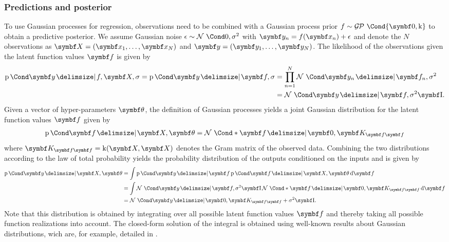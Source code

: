 \subsubsection{Predictions and posterior}
To use Gaussian processes for regression, observations need to be combined with a Gaussian process prior $f \sim \GP\Cond{\mat{0}, \K}$ to obtain a predictive posterior.
We assume Gaussian noise $\epsilon \sim \Gaussian{0, \sigma^2}$ with $\mat{y}_n = f(\mat{x}_n) + \epsilon$ and denote the $N$ observations as $\mat{X} = (\mat{x}_1, \dots, \mat{x}_N)$ and $\mat{y} = (\mat{y}_1, \dots, \mat{y}_N)$.
The likelihood of the observations given the latent function values $\mat{f}$ is given by
\begin{equation}
    \begin{split}
        \Prob{\mat{y} \given f, \mat{X}, \sigma}
        = \Prob{\mat{y} \given \mat{f}, \sigma}
        &= \prod_{n = 1}^N \Gaussian{\mat{y}_n \given \mat{f}_n, \sigma^2} \\
        &= \Gaussian{\mat{y} \given \mat{f}, \sigma^2 \Eye}.
    \end{split}
\end{equation}
Given a vector of hyper-parameters $\mat{\theta}$, the definition of Gaussian processes yields a joint Gaussian distribution for the latent function values $\mat{f}$ given by
\begin{align}
    \Prob{\mat{f} \given \mat{X}, \mat{\theta}} = \Gaussian*{\mat{f} \given \mat{0}, \mat{K}_{\mat{f}\mat{f}}}
\end{align}
where $\mat{K}_{\mat{f}\mat{f}} = \K(\mat{X}, \mat{X})$ denotes the Gram matrix of the observed data.
Combining the two distributions according to the law of total probability yields the probability distribution of the outputs conditioned on the inputs and is given by
\begin{equation}
    \begin{split}
        \label{eq:gp:gp_marginal_likelihood}
        \Prob{\mat{y} \given \mat{X}, \mat{\theta}} &= \int \Prob{\mat{y} \given \mat{f}} \Prob{\mat{f} \given \mat{X}, \mat{\theta}} \diff \mat{f} \\
        &= \int \Gaussian{\mat{y} \given \mat{f}, \sigma^2 \Eye} \Gaussian*{\mat{f} \given \mat{0}, \mat{K}_{\mat{f}\mat{f}}} \diff \mat{f} \\
        &= \Gaussian{\mat{y} \given \mat{0}, \mat{K}_{\mat{f}\mat{f}} + \sigma^2 \Eye}.
    \end{split}
\end{equation}
Note that this distribution is obtained by integrating over all possible latent function values $\mat{f}$ and thereby taking all possible function realizations into account.
The closed-form solution of the integral is obtained using well-known results about Gaussian distributions, wich are, for example, detailed in \cite{petersen_matrix_2008}.

